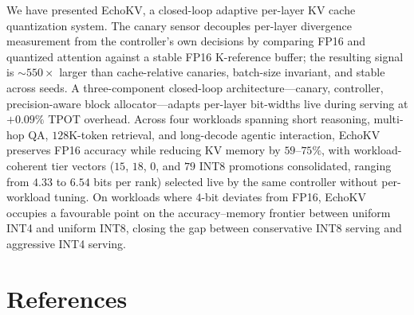 \documentclass{article}
\begin{document}
We have presented EchoKV, a closed-loop adaptive per-layer KV cache
quantization system. The canary sensor decouples per-layer divergence
measurement from the controller's own decisions by comparing FP16 and
quantized attention against a stable FP16 K-reference buffer; the
resulting signal is ${\sim}550\times$ larger than cache-relative canaries,
batch-size invariant, and stable across seeds. A three-component
closed-loop architecture---canary, controller, precision-aware block
allocator---adapts per-layer bit-widths live during serving at $+0.09\%$
TPOT overhead. Across four workloads
spanning short reasoning, multi-hop QA, $128$K-token retrieval, and
long-decode agentic interaction, EchoKV preserves FP16 accuracy while
reducing KV memory by $59$--$75\%$, with workload-coherent tier vectors
($15$, $18$, $0$, and $79$ INT8 promotions consolidated, ranging from
$4.33$ to $6.54$ bits per rank) selected live by the same controller
without per-workload tuning. On workloads where $4$-bit deviates from
FP16, EchoKV occupies a favourable point on the accuracy--memory frontier
between uniform INT4 and uniform INT8, closing the gap between
conservative INT8 serving and aggressive INT4 serving.

\section*{References}
\end{document}
